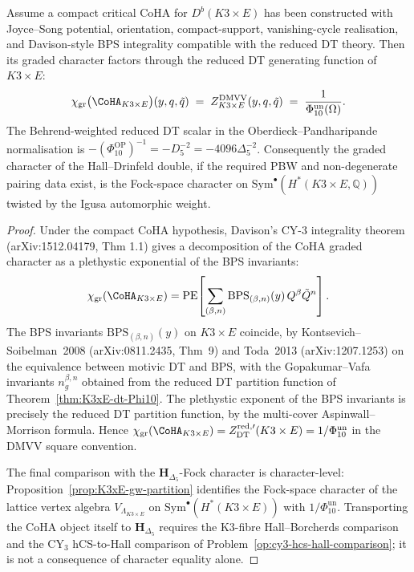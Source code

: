 \begin{theorem}
\label{thm:K3xE-coha-character-igusa}
Assume a compact critical CoHA for $D^b(K3 \times E)$ has been
constructed with Joyce--Song potential, orientation, compact-support,
vanishing-cycle realisation, and Davison-style BPS integrality
compatible with the reduced DT theory. Then its graded character
factors through the reduced DT generating function of $K3 \times E$:
\[
 \chi_{\mathrm{gr}}\bigl(\CoHA_{K3 \times E}\bigr)(y, q, \tilde q)
 \;=\; Z^{\mathrm{DMVV}}_{K3\times E}(y, q, \tilde q)
 \;=\; \frac{1}{\Phi_{10}^{\mathrm{un}}(\Omega)}.
\]
The Behrend-weighted reduced DT scalar in the Oberdieck--Pandharipande
normalisation is
\(-(\Phi_{10}^{\mathrm{OP}})^{-1}=-D_5^{-2}=-4096\Delta_5^{-2}\).
Consequently the graded character of the Hall--Drinfeld double, if the
required PBW and non-degenerate pairing data exist, is the Fock-space
character on
$\mathrm{Sym}^\bullet(H^*(K3 \times E, \mathbb Q))$ twisted by the
Igusa automorphic weight.
\end{theorem}

\begin{proof}
Under the compact CoHA hypothesis, Davison's CY-$3$ integrality theorem
(arXiv:1512.04179, Thm 1.1) gives a decomposition of the CoHA graded
character as a
plethystic exponential of the BPS invariants:
\[
 \chi_{\mathrm{gr}}(\CoHA_{K3 \times E})
 = \mathrm{PE}\!\left[\sum_{(\beta, n)} \mathrm{BPS}_{(\beta, n)}(y)
 \, Q^\beta \tilde Q^n\right].
\]
The BPS invariants $\mathrm{BPS}_{(\beta, n)}(y)$ on $K3 \times E$
coincide, by Kontsevich--Soibelman~2008 (arXiv:0811.2435, Thm~9) and
Toda~2013 (arXiv:1207.1253) on the
equivalence between motivic DT and BPS, with the Gopakumar--Vafa
invariants $n^{\beta, n}_g$ obtained from the reduced DT partition
function of Theorem~\ref{thm:K3xE-dt-Phi10}. The plethystic exponent
of the BPS invariants is precisely the reduced DT partition function,
by the multi-cover Aspinwall--Morrison formula. Hence
$\chi_{\mathrm{gr}}(\CoHA_{K3 \times E}) = Z^{\mathrm{red}, \prime}_{\mathrm{DT}}
 (K3 \times E) = 1/\Phi_{10}^{\mathrm{un}}$ in the DMVV square convention.

The final comparison with the $\mathbf{H}_{\Delta_5}$-Fock character is
character-level: Proposition~\ref{prop:K3xE-gw-partition} identifies the
Fock-space character of the lattice vertex algebra
$V_{\Lambda_{K3 \times E}}$ on $\mathrm{Sym}^\bullet(H^*(K3 \times E))$
with \(1/\Phi_{10}^{\mathrm{un}}\). Transporting the CoHA object itself to
$\mathbf{H}_{\Delta_5}$ requires the K3-fibre Hall--Borcherds
comparison and the CY$_3$ hCS-to-Hall comparison of
Problem~\ref{op:cy3-hcs-hall-comparison}; it is not a consequence of
character equality alone.
\end{proof}


